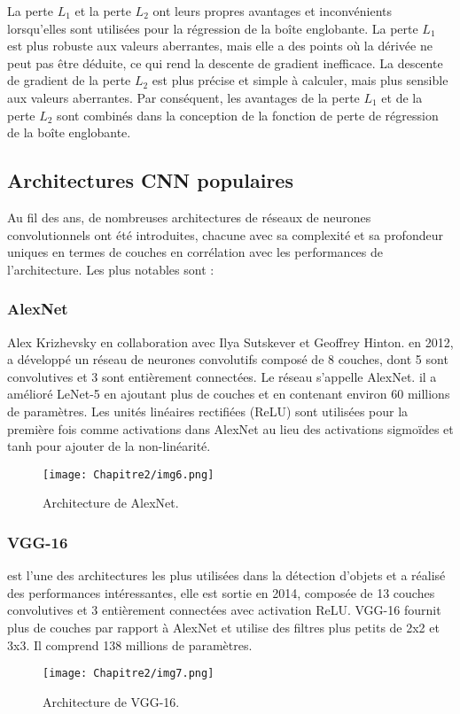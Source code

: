           La perte $L_1$ et la perte $L_2$ ont leurs propres avantages et inconvénients lorsqu'elles sont utilisées pour la régression de la boîte englobante.
          La perte $L_1$ est plus robuste aux valeurs aberrantes, mais elle a des points où la dérivée ne peut pas être déduite, ce qui rend la descente de gradient inefficace.
          La descente de gradient de la perte $L_2$ est plus précise et simple à calculer, mais plus sensible aux valeurs aberrantes.
          Par conséquent, les avantages de la perte $L_1$ et de la perte $L_2$ sont combinés dans la conception de la fonction de perte de régression de la boîte englobante.

     \subsection{Architectures CNN populaires} 
     Au fil des ans, de nombreuses architectures de réseaux de neurones convolutionnels ont été introduites, chacune avec sa complexité et sa profondeur uniques en termes de couches en corrélation avec les performances de l'architecture. Les plus notables sont :
     
          \subsubsection{AlexNet} \cite{alex_paper}
          Alex Krizhevsky en collaboration avec Ilya Sutskever et Geoffrey Hinton. en 2012, a développé un réseau de neurones convolutifs composé de 8 couches, dont 5 sont convolutives et 3 sont entièrement connectées. Le réseau s'appelle AlexNet. il a amélioré LeNet-5 en ajoutant plus de couches et en contenant environ 60 millions de paramètres. Les unités linéaires rectifiées (ReLU) sont utilisées pour la première fois comme activations dans AlexNet au lieu des activations sigmoïdes et tanh pour ajouter de la non-linéarité.
          \begin{figure}[H]
               \centering
               \texttt{[image: Chapitre2/img6.png]}
               \caption{Architecture de AlexNet.}
               \label{img6}
               \end{figure}

          \subsubsection{VGG-16} \cite{vgg_paper}
          est l'une des architectures les plus utilisées dans la détection d'objets et a 	réalisé des performances intéressantes, elle est sortie en 2014, composée de 13 couches convolutives et 3 entièrement connectées avec activation ReLU. VGG-16 fournit plus de couches par rapport à AlexNet et utilise des filtres plus petits de 2x2 et 3x3. Il comprend 138 millions de paramètres.
          \begin{figure}[H]
               \centering
               \texttt{[image: Chapitre2/img7.png]}
               \caption{Architecture de VGG-16.}
               \label{img7}
               \end{figure}

